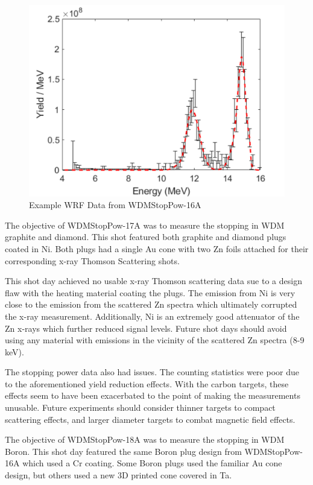 \begin{figure}[!h]
    \centering
    \includegraphics[scale=0.7]{Figures/wdmExampleWarmWRF.pdf}
    \caption[Example WRF Data from Om82291]{Example WRF Data from WDMStopPow-16A}
    \label{fig:exampleWarmWRFData}
\end{figure}

The objective of WDMStopPow-17A was to measure the stopping in WDM graphite and diamond. This shot featured both graphite and diamond plugs coated in Ni. Both plugs had a single Au cone with two Zn foils attached for their corresponding x-ray Thomson Scattering shots. 

This shot day achieved no usable x-ray Thomson scattering data sue to a design flaw with the heating material coating the plugs. The emission from Ni is very close to the emission from the scattered Zn spectra which ultimately corrupted the x-ray measurement. Additionally, Ni is an extremely good attenuator of the Zn x-rays which further reduced signal levels. Future shot days should avoid using any material with emissions in the vicinity of the scattered Zn spectra (8-9 keV).

The stopping power data also had issues. The counting statistics were poor due to the aforementioned yield reduction effects. With the carbon targets, these effects seem to have been exacerbated to the point of making the measurements unusable. Future experiments should consider thinner targets to compact scattering effects, and larger diameter targets to combat magnetic field effects.


The objective of WDMStopPow-18A was to measure the stopping in WDM Boron. This shot day featured the same Boron plug design from WDMStopPow-16A which used a Cr coating. Some Boron plugs used the familiar Au cone design, but others used a new 3D printed cone covered in Ta. 

